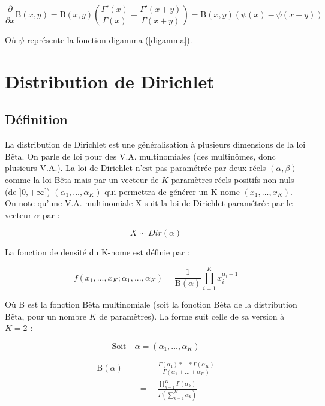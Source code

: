 \documentclass[french]{article}
\numberwithin{equation}{section}
\begin{document}
\begin{equation}
\frac{\partial}{\partial x} \text{B}(x, y) = \text{B}(x, y) \left( \frac{\Gamma'(x)}{\Gamma(x)} - \frac{\Gamma'(x+y)}{\Gamma(x+y)} \right) = \text{B}(x, y)( \psi(x) - \psi(x+y))
\end{equation}

Où $\psi$ représente la fonction digamma (\ref{digamma}).

\section{Distribution de Dirichlet}

\subsection{Définition}

La distribution de Dirichlet est une généralisation à plusieurs dimensions de la loi Bêta. On parle de loi pour des V.A. multinomiales (des multinômes, donc plusieurs V.A.). La loi de Dirichlet n'est pas paramétrée par deux réels $(\alpha, \beta)$ comme la loi Bêta mais par un vecteur de $K$ paramètres réels positifs non nuls (de $]0, +\infty]$) $(\alpha_1, ..., \alpha_K)$ qui permettra de générer un K-nome $(x_1, ..., x_K)$. \\

On note qu'une V.A. multinomiale X suit la loi de Dirichlet paramétrée par le vecteur $\alpha$ par :

\[ X \sim Dir(\alpha) \]

La fonction de densité du K-nome est définie par :

\begin{equation}
f(x_1, ..., x_K; \alpha_1, ..., \alpha_K) = \frac{1}{\text{B}(\alpha)} \prod_{i=1}^{K}x_i^{\alpha_i - 1}
\end{equation}

Où B est la fonction Bêta multinomiale (soit la fonction Bêta de la distribution Bêta, pour un nombre $K$ de paramètres). La forme suit celle de sa version à $K=2$ :

\[ \text{Soit} \quad \alpha = (\alpha_1, ..., \alpha_K) \]

\begin{align}
\text{B}(\alpha) \quad &= \quad \frac{\Gamma(\alpha_1) * ... * \Gamma(\alpha_K)}{\Gamma(\alpha_1 + ... + \alpha_K)} \nonumber\\
&= \quad \frac{\prod_{k=1}^{K} \Gamma(\alpha_k)}{\Gamma(\sum_{k=1}^{K} \alpha_k)}
\end{align}
\end{document}
